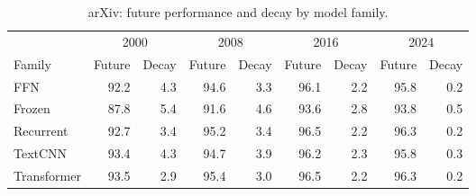 \begin{table}[H]
\centering
\footnotesize
\caption{arXiv: future performance and decay by model family.}
\label{tab:arxiv_by_family}
\begin{tabular}{l rrrrrrrr}
\toprule
 & \multicolumn{2}{c}{2000} & \multicolumn{2}{c}{2008} & \multicolumn{2}{c}{2016} & \multicolumn{2}{c}{2024} \\
Family & Future & Decay & Future & Decay & Future & Decay & Future & Decay \\
\midrule
FFN & 92.2 & 4.3 & 94.6 & 3.3 & 96.1 & 2.2 & 95.8 & 0.2 \\
Frozen & 87.8 & 5.4 & 91.6 & 4.6 & 93.6 & 2.8 & 93.8 & 0.5 \\
Recurrent & 92.7 & 3.4 & 95.2 & 3.4 & 96.5 & 2.2 & 96.3 & 0.2 \\
TextCNN & 93.4 & 4.3 & 94.7 & 3.9 & 96.2 & 2.3 & 95.8 & 0.3 \\
Transformer & 93.5 & 2.9 & 95.4 & 3.0 & 96.5 & 2.2 & 96.3 & 0.2 \\
\bottomrule
\end{tabular}
\end{table}
